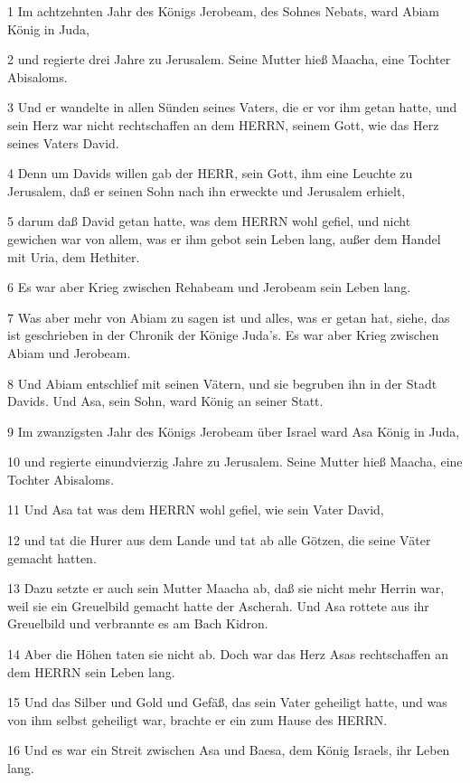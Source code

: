 \par 1 Im achtzehnten Jahr des Königs Jerobeam, des Sohnes Nebats, ward Abiam König in Juda,
\par 2 und regierte drei Jahre zu Jerusalem. Seine Mutter hieß Maacha, eine Tochter Abisaloms.
\par 3 Und er wandelte in allen Sünden seines Vaters, die er vor ihm getan hatte, und sein Herz war nicht rechtschaffen an dem HERRN, seinem Gott, wie das Herz seines Vaters David.
\par 4 Denn um Davids willen gab der HERR, sein Gott, ihm eine Leuchte zu Jerusalem, daß er seinen Sohn nach ihn erweckte und Jerusalem erhielt,
\par 5 darum daß David getan hatte, was dem HERRN wohl gefiel, und nicht gewichen war von allem, was er ihm gebot sein Leben lang, außer dem Handel mit Uria, dem Hethiter.
\par 6 Es war aber Krieg zwischen Rehabeam und Jerobeam sein Leben lang.
\par 7 Was aber mehr von Abiam zu sagen ist und alles, was er getan hat, siehe, das ist geschrieben in der Chronik der Könige Juda's. Es war aber Krieg zwischen Abiam und Jerobeam.
\par 8 Und Abiam entschlief mit seinen Vätern, und sie begruben ihn in der Stadt Davids. Und Asa, sein Sohn, ward König an seiner Statt.
\par 9 Im zwanzigsten Jahr des Königs Jerobeam über Israel ward Asa König in Juda,
\par 10 und regierte einundvierzig Jahre zu Jerusalem. Seine Mutter hieß Maacha, eine Tochter Abisaloms.
\par 11 Und Asa tat was dem HERRN wohl gefiel, wie sein Vater David,
\par 12 und tat die Hurer aus dem Lande und tat ab alle Götzen, die seine Väter gemacht hatten.
\par 13 Dazu setzte er auch sein Mutter Maacha ab, daß sie nicht mehr Herrin war, weil sie ein Greuelbild gemacht hatte der Ascherah. Und Asa rottete aus ihr Greuelbild und verbrannte es am Bach Kidron.
\par 14 Aber die Höhen taten sie nicht ab. Doch war das Herz Asas rechtschaffen an dem HERRN sein Leben lang.
\par 15 Und das Silber und Gold und Gefäß, das sein Vater geheiligt hatte, und was von ihm selbst geheiligt war, brachte er ein zum Hause des HERRN.
\par 16 Und es war ein Streit zwischen Asa und Baesa, dem König Israels, ihr Leben lang.
